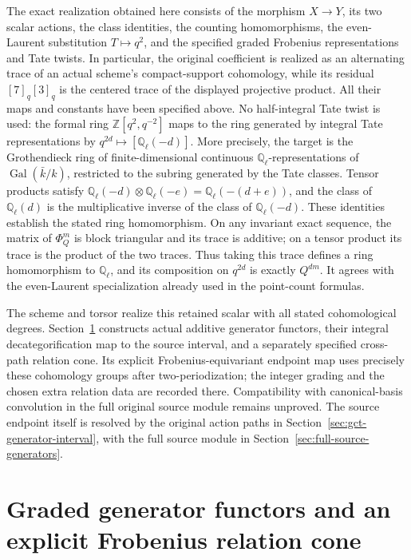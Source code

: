 The exact realization obtained here consists of the morphism
$X\to Y$, its two scalar actions, the class identities, the counting
homomorphisms, the even-Laurent substitution $T\mapsto q^2$, and the
specified graded Frobenius representations and Tate twists. In particular,
the original coefficient is realized as an alternating trace of an actual
scheme's compact-support cohomology, while its residual $[7]_q[3]_q$
is the centered trace of the displayed projective product. All their
maps and constants have been specified above. No half-integral Tate
twist is used: the formal ring $\mathbb Z[q^2,q^{-2}]$ maps to the
ring generated by integral Tate representations by
$q^{2d}\mapsto[\mathbb Q_\ell(-d)]$.
More precisely, the target is the Grothendieck ring of finite-dimensional
continuous $\mathbb Q_\ell$-representations of
$\operatorname{Gal}(\bar k/k)$, restricted to the subring generated by
the Tate classes. Tensor products satisfy
$\mathbb Q_\ell(-d)\otimes\mathbb Q_\ell(-e)
=\mathbb Q_\ell(-(d+e))$, and the class of
$\mathbb Q_\ell(d)$ is the multiplicative inverse of the class of
$\mathbb Q_\ell(-d)$. These identities establish the stated ring
homomorphism. On any invariant exact sequence, the matrix of
$\Phi_Q^m$ is block triangular and its trace is additive; on a tensor
product its trace is the product of the two traces. Thus taking this
trace defines a ring homomorphism to $\mathbb Q_\ell$, and its
composition on $q^{2d}$ is exactly $Q^{dm}$. It agrees with the
even-Laurent specialization already used in the point-count formulas.

The scheme and torsor realize this retained scalar with all stated
cohomological degrees. Section~\ref{sec:fgb} constructs actual
additive generator functors, their integral decategorification map
to the source interval, and a separately specified cross-path relation
cone. Its explicit Frobenius-equivariant endpoint map uses precisely
these cohomology groups after two-periodization; the integer grading
and the chosen extra relation data are recorded there. Compatibility
with canonical-basis convolution in the full original source module
remains unproved. The source endpoint itself is resolved by the
original action paths in Section~\ref{sec:gct-generator-interval},
with the full source module in Section~\ref{sec:full-source-generators}.

\section{Graded generator functors and an explicit Frobenius relation cone}
\label{sec:fgb}

